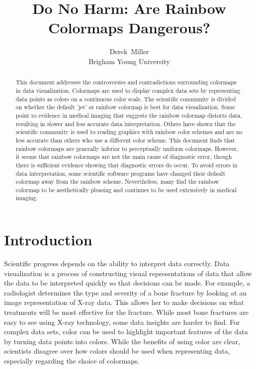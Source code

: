 \documentclass[journal,12pt]{IEEEtran}
\title{Do No Harm: Are Rainbow Colormaps Dangerous? \\}
\author{Derek~Miller \\ Brigham Young University}%
\begin{document}
\begin{titlepage}
\maketitle
\thispagestyle{empty}

\begin{abstract}
This document addresses the controversies and contradictions
surrounding colormaps in data visualization.
Colormaps are used to display complex data sets by
representing data points as colors on a continuous color scale. The scientific
community is divided on whether the default 'jet' or rainbow colormap
is best for data visualization. Some point to evidence in medical imaging
that suggests the rainbow colormap distorts data, resulting in slower and 
less accurate data interpretation. Others have shown that the
scientific community is used to reading graphics with rainbow
color schemes and are no less accurate than others who use
a different color scheme. This document finds that rainbow colormaps
are generally inferior to perceptually uniform colormaps. However, it
seems that rainbow colormaps are not the main cause of diagnostic error,
though there is sufficient evidence showing that diagnostic errors do occur.
To avoid errors in data interpretation, some scientific software programs
have changed their default colormap away from the rainbow scheme.
Nevertheless, many find the rainbow colormap to be aesthetically pleasing
and continues to be used extensively in medical imaging.
\end{abstract}
\tableofcontents
\vspace*{\fill}
\end{titlepage}

\IEEEpeerreviewmaketitle

\section{Introduction}
Scientific progress depends on the ability to interpret data correctly. Data visualization is a process of
constructing visual representations of data that allow the data to be interpreted quickly so that decisions
can be made.
For example, a radiologist determines the
type and severity of a bone fracture by looking at an
image representation of X-ray data. This allows her to make decisions on what treatments will be most effective
for the fracture. While most bone fractures are easy to see using X-ray technology, some data insights are
harder to find. For complex data sets, color can be used to highlight important features
of the data by turning data points into colors. While the benefits of using color are clear,
scientists disagree over how colors should be used when representing data, especially regarding the choice
of colormaps.
\end{document}
